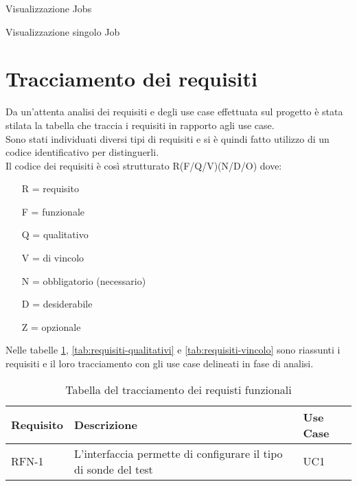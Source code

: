\begin{usecase}{6}{Visualizzazione Jobs}
  \label{uc:visualizzazione-jobs}
\end{usecase}

\begin{usecase}{7}{Visualizzazione singolo Job}
  \label{uc:visualizzazione-job}
\end{usecase}

\section{Tracciamento dei requisiti}

Da un'attenta analisi dei requisiti e degli use case effettuata sul progetto è stata stilata la tabella che traccia i requisiti in rapporto agli use case.\\
Sono stati individuati diversi tipi di requisiti e si è quindi fatto utilizzo di un codice identificativo per distinguerli.\\
Il codice dei requisiti è così strutturato R(F/Q/V)(N/D/O) dove:
\begin{enumerate}
  \item[R =] requisito
  \item[F =] funzionale
  \item[Q =] qualitativo
  \item[V =] di vincolo
  \item[N =] obbligatorio (necessario)
  \item[D =] desiderabile
  \item[Z =] opzionale
\end{enumerate}
Nelle tabelle \ref{tab:requisiti-funzionali}, \ref{tab:requisiti-qualitativi} e \ref{tab:requisiti-vincolo} sono riassunti i requisiti e il loro tracciamento con gli use case delineati in fase di analisi.

\newpage

\begin{table}%
  \caption{Tabella del tracciamento dei requisti funzionali}
  \label{tab:requisiti-funzionali}
  \begin{tabularx}{\textwidth}{lXl}
    \hline\hline
    \textbf{Requisito} & \textbf{Descrizione}                                            & \textbf{Use Case} \\
    \hline
    RFN-1              & L'interfaccia permette di configurare il tipo di sonde del test & UC1               \\
    \hline
  \end{tabularx}
\end{table}%

